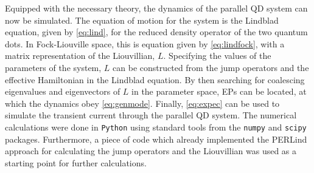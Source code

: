 \documentclass[../main.tex]{subfiles}
\begin{document}
Equipped with the necessary theory, the dynamics of the parallel QD system can now be simulated. The equation of motion for the system is the Lindblad equation, given by \cref{eq:lind}, for the reduced density operator of the two quantum dots. In Fock-Liouville space, this is equation given by \cref{eq:lindfock}, with a matrix representation of the Liouvillian, $L$. Specifying the values of the parameters of the system, $L$ can be constructed from the jump operators and the effective Hamiltonian in the Lindblad equation. By then searching for coalescing eigenvalues and eigenvectors of $L$ in the parameter space, EPs can be located, at which the dynamics obey \cref{eq:genmode}. Finally, \cref{eq:expec} can be used to simulate the transient current through the parallel QD system. The numerical calculations were done in \verb+Python+ using standard tools from the \verb+numpy+ and \verb+scipy+ packages. Furthermore, a piece of code which already implemented the PERLind approach for calculating the jump operators and the Liouvillian was used as a starting point for further calculations.
\end{document}
